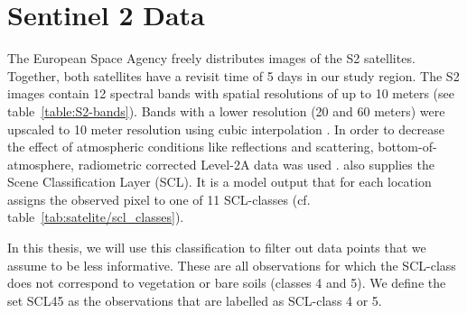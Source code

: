 \section{Sentinel 2 Data}{
	\label{sec:s2_img_data}
		The European Space Agency \citep{esaSentinel22022} freely distributes images of the S2 satellites. Together, both satellites have a revisit time of 5 days in our study region.
		The S2 images contain 12 spectral bands with spatial resolutions of up to 10 meters (see table~\ref{table:S2-bands}). Bands with a lower resolution (20 and 60 meters) were upscaled to 10 meter resolution using cubic interpolation \citep{perichPixelbasedCropYield2022}. In order to decrease the effect of atmospheric conditions like reflections and scattering, bottom-of-atmosphere, radiometric corrected Level-2A data was used \citep{esaEuropeanSpaceAgency2022}. %
		\cite{esaEuropeanSpaceAgency2022} also supplies the Scene Classification Layer ({SCL}). It is a model output that for each location assigns the observed pixel to one of 11 SCL-classes (cf. table~\ref{tab:satelite/scl_classes}). 
		
		In this thesis, we will use this classification to filter out data points that we assume to be less informative. These are all observations for which the SCL-class does not correspond to vegetation or bare soils (classes 4 and 5). We define the set SCL45 as the observations that are labelled as SCL-class 4 or 5.
		

		
		

	
}

